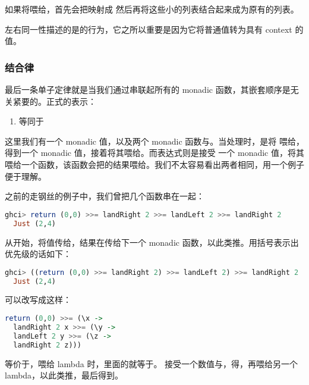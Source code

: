 \documentclass[./main.tex]{subfiles}
\begin{document}
如果将\acode{[1,2,3,4]}喂给，首先会把\acode{[1,2,3,4]}映射成\acode{[[1],[2],[3],[4]]}
然后再将这些小的列表结合起来成为原有的列表。

左右同一性描述的是的行为，它之所以重要是因为它将普通值转为具有 context 的值。

\subsubsection*{结合律}

最后一条单子定律就是当我们通过\acode{>>=}串联起所有的 monadic 函数，其嵌套顺序是无关紧要的。正式的表示：

\begin{enumerate}
  \item {}等同于
\end{enumerate}

这里我们有一个 monadic 值，以及两个 monadic 函数与。当处理时，是将
喂给，得到一个 monadic 值，接着将其喂给。而表达式则是接受
一个 monadic 值，将其喂给一个函数，该函数会把的结果喂给。我们不太容易看出两者相同，用一个例子便于理解。

之前的走钢丝的例子中，我们曾把几个函数串在一起：

\begin{lstlisting}[language=Haskell]
  ghci> return (0,0) >>= landRight 2 >>= landLeft 2 >>= landRight 2
  Just (2,4)
\end{lstlisting}

从开始，将值传给，结果在传给下一个 monadic 函数，以此类推。用括号表示出优先级的话如下：

\begin{lstlisting}[language=Haskell]
  ghci> ((return (0,0) >>= landRight 2) >>= landLeft 2) >>= landRight 2
  Just (2,4)
\end{lstlisting}

可以改写成这样：

\begin{lstlisting}[language=Haskell]
  return (0,0) >>= (\x ->
  landRight 2 x >>= (\y ->
  landLeft 2 y >>= (\z ->
  landRight 2 z)))
\end{lstlisting}

等价于，喂给 lambda 时，里面的就等于。
接受一个数值与，得，再喂给另一个 lambda，以此类推，最后得到。
\end{document}

